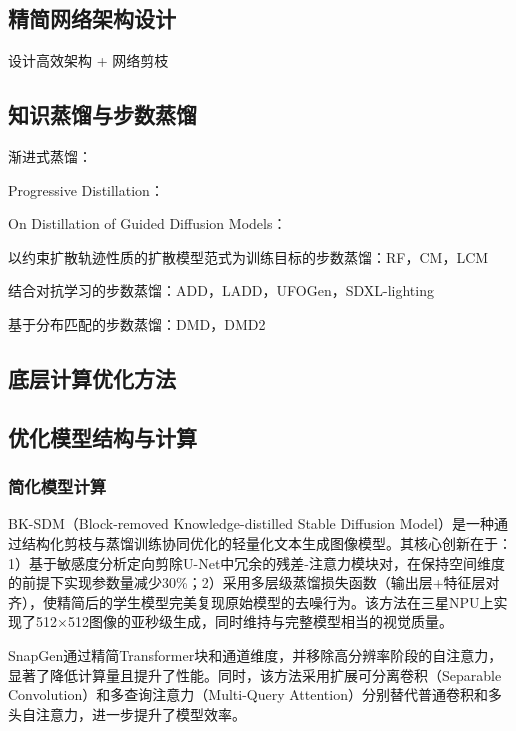 \documentclass[11pt,a4paper,UTF8]{ctexart}
\begin{document}
\subsection{精简网络架构设计}

设计高效架构 + 网络剪枝\cite{li2023snapfusion,kim2023architectural,zhao2024mobilediffusion}


\subsection{知识蒸馏与步数蒸馏}

渐进式蒸馏：

Progressive Distillation\cite{salimans2021progressive}：

On Distillation of Guided Diffusion Models\cite{meng2022distillation}：

以约束扩散轨迹性质的扩散模型范式为训练目标的步数蒸馏：RF，CM，LCM

结合对抗学习的步数蒸馏：ADD，LADD，UFOGen，SDXL-lighting

基于分布匹配的步数蒸馏：DMD，DMD2


\subsection{底层计算优化方法}


\newpage

\subsection{优化模型结构与计算}

\subsubsection{简化模型计算}

BK-SDM（Block-removed Knowledge-distilled Stable Diffusion Model）是一种通过结构化剪枝与蒸馏训练协同优化的轻量化文本生成图像模型。其核心创新在于：1）基于敏感度分析定向剪除U-Net中冗余的残差-注意力模块对，在保持空间维度的前提下实现参数量减少30\%；2）采用多层级蒸馏损失函数（输出层+特征层对齐），使精简后的学生模型完美复现原始模型的去噪行为。该方法在三星NPU上实现了512×512图像的亚秒级生成，同时维持与完整模型相当的视觉质量。

SnapGen\cite{hu2024snapgen}通过精简Transformer块和通道维度，并移除高分辨率阶段的自注意力，显著了降低计算量且提升了性能。同时，该方法采用扩展可分离卷积（Separable Convolution）\cite{howard2017mobilenets}和多查询注意力（Multi-Query Attention）\cite{shazeer2019fast}分别替代普通卷积和多头自注意力，进一步提升了模型效率。
\end{document}
